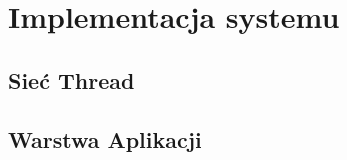 \chapter{Implementacja systemu}
\label{cha:implementacja}

\section{Sieć Thread}

\section{Warstwa Aplikacji}
